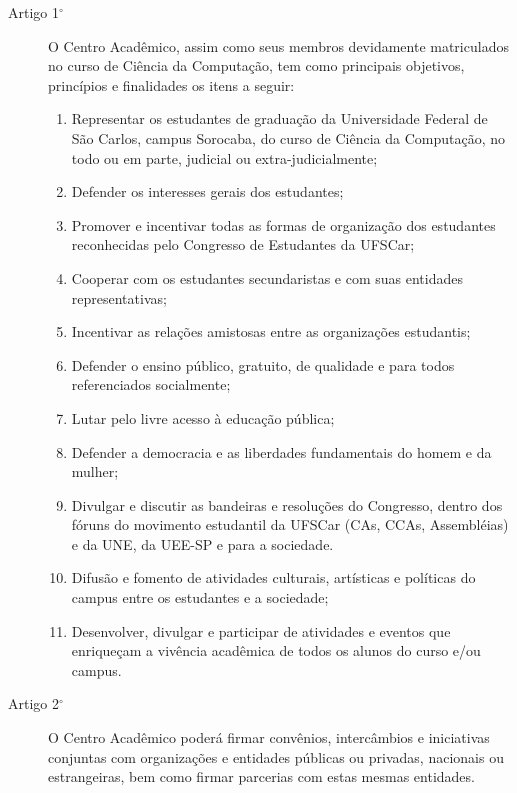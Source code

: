 \documentclass[12pt]{article}
\begin{document}
\begin{description}
\item[Artigo 1$^\circ$]{O Centro Acadêmico, assim como seus membros
devidamente matriculados no curso de Ciência da Computação, tem como principais
objetivos, princípios e finalidades os itens a seguir:}
        \begin{enumerate}[label=(\alph*)]
        \item{Representar os estudantes de graduação da Universidade Federal de São
        Carlos, campus Sorocaba, do curso de Ciência da Computação, no todo ou em
        parte, judicial ou extra-judicialmente;}
        \item Defender os interesses gerais dos estudantes;
        \item{Promover e incentivar todas as formas de organização dos estudantes
        reconhecidas pelo Congresso de Estudantes da UFSCar;}
        \item{Cooperar com os estudantes secundaristas e com suas entidades
        representativas;}
        \item{Incentivar as relações amistosas entre as organizações estudantis;}
        \item{Defender o ensino público, gratuito, de qualidade e para todos
        referenciados socialmente;}
        \item Lutar pelo livre acesso à educação pública;
        \item{Defender a democracia e as liberdades fundamentais do homem e da
        mulher;}
        \item{Divulgar e discutir as bandeiras e resoluções do Congresso, dentro
        dos fóruns do movimento estudantil da UFSCar (CAs, CCAs, Assembléias) e da
        UNE, da UEE-SP e para a sociedade.}
        \item{Difusão e fomento de atividades culturais, artísticas e políticas do
        campus entre os estudantes e a sociedade;}
        \item{Desenvolver, divulgar e participar de atividades e eventos que
        enriqueçam a vivência acadêmica de todos os alunos do curso e/ou campus.}
    \end{enumerate}
\item[Artigo 2$^\circ$]{O Centro Acadêmico poderá firmar convênios, intercâmbios e
iniciativas conjuntas com organizações e entidades públicas ou privadas,
nacionais ou estrangeiras, bem como firmar parcerias com estas mesmas
entidades.}
\end{description}
\end{document}
